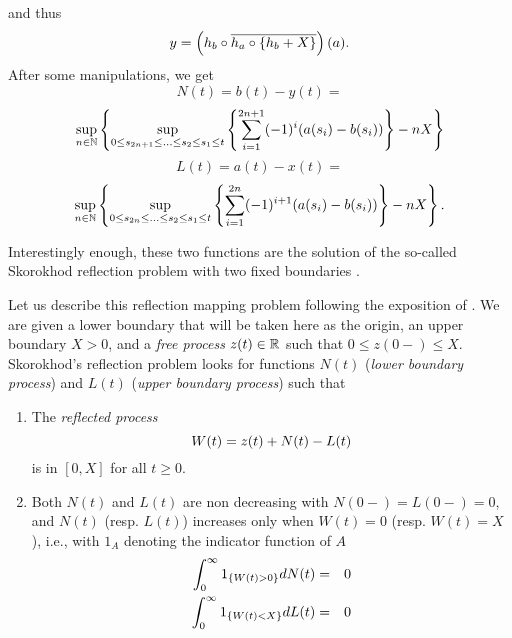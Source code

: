 and thus
\begin{equation}
\mylabel{eq:closure-Sko2} y = \left( h_b \circ \overline{   h_{a}
\circ \{h_b + X \}  }  \right) (a).
\end{equation}
%
%
After some manipulations, we get
$$N(t)  =  b(t) - y(t) = $$
\begin{equation}
 \mylabel{eq:Ndev}
\sup_{n \in \Nats}  \left\{ \sup_{0  \leq s_{2n+1} \leq \ldots
\leq s_2 \leq s_1 \leq t}
  \left\{ \sum_{i=1}^{2n+1} (-1)^{i} (a(s_{i}) -b(s_i)) \right\} - nX
\right\}
\end{equation}
$$L(t)  =  a(t) - x(t) = $$
  \begin{equation}
\mylabel{eq:Ldev}
 \sup_{n \in \Nats}  \left\{ \sup_{0  \leq s_{2n} \leq \ldots
\leq s_2 \leq s_1 \leq t}
  \left\{ \sum_{i=1}^{2n} (-1)^{i+1} (a(s_{i}) - b(s_i)) \right\} -
nX \right\}.
\end{equation}

Interestingly enough, these two functions are the solution of the so-called Skorokhod
reflection problem with two fixed boundaries \cite{Skorokhod,Harrison}.

Let us describe this reflection mapping  problem following the
exposition of \cite{Konstanto95}.
 We are given  a lower boundary that will be taken
here as the origin, an upper boundary $X>0$, and a {\em free process}
$z(t) \in \mathbb{R}$ such that $0 \leq z(0-) \leq X$.
Skorokhod's reflection problem looks for functions
$N(t)$ ({\em lower boundary process}) and $L(t)$ ({\em upper boundary
process}) such that
\begin{enumerate}
\item
The {\em reflected process}
\begin{equation}
\mylabel{eq:reflectedprocess}
W(t) = z(t) + N(t) - L(t)
\end{equation}
is in $[0,X]$ for all $t \geq 0$.

\item
Both $N(t)$ and $L(t)$ are non decreasing with $N(0-) = L(0-) = 0$,
and $N(t)$ (resp.  $L(t)$) increases only when $W(t) = 0$ (resp.
$W(t)=X$), i.e.,
with $1_A$ denoting the indicator function of $A$
\begin{eqnarray}
\mylabel{eq:lowerprocesscond}
\int_0^{\infty} 1_{\{ W(t) > 0 \} } dN(t) & = & 0 \\
\mylabel{eq:upperprocesscond}
\int_0^{\infty} 1_{\{ W(t) < X \} } dL(t) & = & 0
\end{eqnarray}
\end{enumerate}

